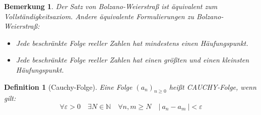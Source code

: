 \documentclass[a4paper,titlepage,oneside]{article}
\def\N{\ensuremath{\mathbb{N}} }
\renewcommand{\epsilon}{\ensuremath{\varepsilon} }
\newcommand{\abs}[1]{\ensuremath{\left|\:#1\:\right|}}
\theoremstyle{thmstyle}
\newtheorem{defi}[satz]{Definition}
\newtheorem{bem}[satz]{Bemerkung}
\begin{document}
\begin{bem}
Der Satz von Bolzano-Weierstraß ist äquivalent zum Vollständigkeitsaxiom. Andere äquivalente Formulierungen zu Bolzano-Weierstraß:
\begin{itemize}
\item Jede beschränkte Folge reeller Zahlen hat mindestens einen Häufungspunkt.
\item Jede beschränkte Folge reeller Zahlen hat einen größten und einen kleinsten Häufungspunkt.
\end{itemize}
\end{bem}

\begin{defi}[Cauchy-Folge]
Eine Folge \((a_n)_{n \ge 0}\) heißt CAUCHY-Folge, wenn gilt:
\[\forall \epsilon > 0 \quad \exists N \in \N \quad \forall n, m \ge N \quad \abs{a_n - a_m} < \epsilon\]
\end{defi}
\end{document}
